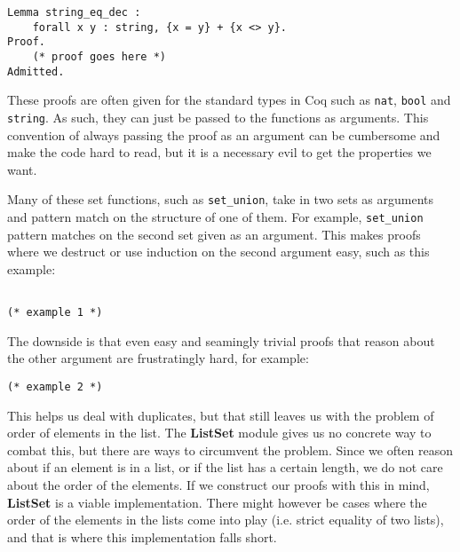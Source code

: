 \begin{lstlisting}[language=Coq, label={lst:string_eq_dec}, caption={Decidability proof for string equality in Coq}]
Lemma string_eq_dec :
    forall x y : string, {x = y} + {x <> y}.
Proof.
    (* proof goes here *)
Admitted.
\end{lstlisting}

These proofs are often given for the standard types in Coq such as \lstinline[language=Coq]{nat},
\lstinline[language=Coq]{bool} and \lstinline[language=Coq]{string}.
As such, they can just be passed to the functions as arguments.
This convention of always passing the proof as an argument can be cumbersome and make the code hard to read,
but it is a necessary evil to get the properties we want.

Many of these set functions, such as \lstinline[language=Coq]{set_union},
take in two sets as arguments and pattern match on the structure of one of them.
For example, \lstinline[language=Coq]{set_union} pattern matches on the second set given as an argument.
This makes proofs where we destruct or use induction on the second argument easy, such as this example:
\begin{lstlisting}[language=Coq, label={lst:set_op_ex1}, caption={Easy proof of lemma in \lstinline{ListSet}}]

(* example 1 *)

\end{lstlisting}

The downside is that even easy and seamingly trivial proofs that reason about the other argument are frustratingly hard,
for example:

\begin{lstlisting}[language=Coq, label={lst:set_op_ex2}, caption={Hard proof of lemma in \lstinline{ListSet}}]
(* example 2 *)
\end{lstlisting}

This helps us deal with duplicates, but that still leaves us with the problem of order of elements in the list.
The \textbf{ListSet} module gives us no concrete way to combat this, but there are ways to circumvent the problem.
Since we often reason about if an element is in a list, or if the list has a certain length,
we do not care about the order of the elements.
If we construct our proofs with this in mind, \textbf{ListSet} is a viable implementation.
There might however be cases where the order of the elements in the lists come into play (i.e. strict equality of two lists),
and that is where this implementation falls short.

